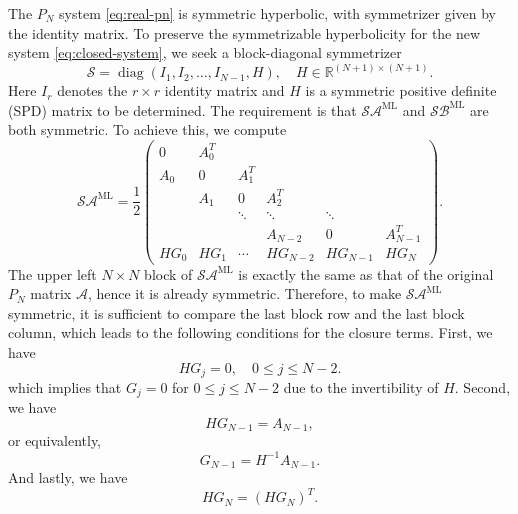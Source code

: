 \documentclass[11pt]{article}
\numberwithin{equation}{section}
\newcommand{\R}{\mathbb{R}}
\newcommand{\half}{\frac{1}{2}}
\newcommand{\diag}{\operatorname{diag}}
\begin{document}
The $P_N$ system \eqref{eq:real-pn} is symmetric hyperbolic, with symmetrizer given by the identity matrix. To preserve the symmetrizable hyperbolicity for the new system \eqref{eq:closed-system}, we seek a block-diagonal symmetrizer
\begin{equation}
    \mathcal{S} = \diag(I_1,I_2,\dots,I_{N-1},H), \quad H\in \R^{(N+1)\times(N+1)}.
\end{equation}
Here $I_r$ denotes the $r\times r$ identity matrix and $H$ is a symmetric positive definite (SPD) matrix to be determined. The requirement is that $\mathcal{S}\mathcal{A}^{\textrm{ML}}$ and $\mathcal{S}\mathcal{B}^{\textrm{ML}}$ are both symmetric. To achieve this, we compute 
\begin{equation}
\mathcal{S}\mathcal{A}^{\textrm{ML}}
=
\half
\begin{pmatrix}
0 & A_0^T \\
A_0 & 0 & A_1^T \\
& A_1 & 0 & A_2^T \\
& & \ddots & \ddots & \ddots \\
& & & A_{N-2} & 0 & A_{N-1}^T \\
H G_0 & H G_1 & \cdots & H G_{N-2} & H G_{N-1} & H G_N
\end{pmatrix}.
\end{equation}
The upper left $N\times N$ block of $\mathcal{S}\mathcal{A}^{\textrm{ML}}$ is exactly the same as that of the original $P_N$ matrix $\mathcal{A}$, hence it is already symmetric. Therefore, to make $\mathcal{S}\mathcal{A}^{\textrm{ML}}$ symmetric, it is sufficient to compare the last block row and the last block
column, which leads to the following conditions for the closure terms. First, we have
\begin{equation}
    H G_j = 0, \quad 0\le j\le N-2.
\end{equation}
which implies that $G_j=0$ for $0\le j\le N-2$ due to the invertibility of $H$.
Second, we have
\begin{equation}
H G_{N-1} = A_{N-1},
\end{equation}
or equivalently,
\begin{equation}
G_{N-1}=H^{-1}A_{N-1}.
\end{equation}
And lastly, we have
\begin{equation}
H G_N = (H G_N)^T.
\end{equation}
\end{document}

